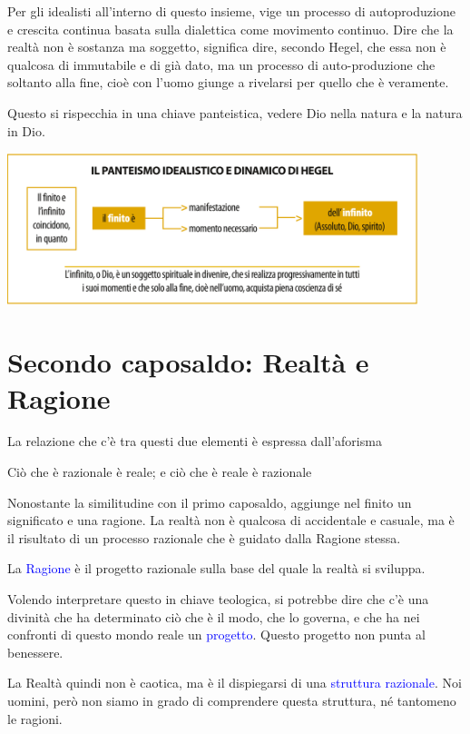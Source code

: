 \documentclass[a4paper, twoside, titlepage]{book}
\renewcommand{\emph}[1]{\textcolor{blue}{#1}}
\begin{document}
Per gli idealisti all’interno di questo insieme, vige un processo di autoproduzione e crescita continua basata sulla dialettica come movimento continuo. Dire che la realtà non è sostanza ma soggetto, significa dire, secondo Hegel, che essa non è qualcosa di immutabile e di già dato, ma un processo di auto-produzione che soltanto alla fine, cioè con l'uomo giunge a rivelarsi per quello che è veramente.

Questo si rispecchia in una chiave panteistica, vedere Dio nella natura e la natura in Dio.

\begin{center}
\includegraphics[width=12cm]{3}
\end{center}

\section{Secondo caposaldo: Realtà e Ragione}

La relazione che c'è tra questi due elementi è espressa dall'aforisma

        Ciò che è razionale è reale; e ciò che è reale è razionale

Nonostante la similitudine con il primo caposaldo, aggiunge nel finito un significato e una ragione. La realtà non è qualcosa di accidentale e casuale, ma è il risultato di un processo razionale che è guidato dalla Ragione stessa.

La \emph{Ragione} è il progetto razionale sulla base del quale la realtà si sviluppa.

Volendo interpretare questo in chiave teologica, si potrebbe dire che c'è una divinità che ha determinato ciò che è il modo, che lo governa, e che ha nei confronti di questo mondo reale un \emph{progetto}. Questo progetto non punta al benessere.

La Realtà quindi non è caotica, ma è il dispiegarsi di una \emph{struttura razionale}. Noi uomini, però non siamo in grado di comprendere questa struttura, né tantomeno le ragioni.
\end{document}

